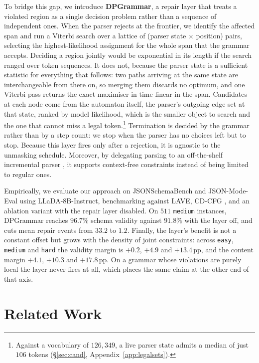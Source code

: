 \documentclass{article}
\begin{document}
To bridge this gap, we introduce \textbf{DPGrammar}, a repair layer that treats
a violated region as a single decision problem rather than a sequence of
independent ones. When the parser rejects at the frontier, we identify the
affected span and run a Viterbi search over a lattice of (parser state $\times$
position) pairs, selecting the highest-likelihood assignment for the whole span
that the grammar accepts. Deciding a region jointly would be exponential in its
length if the search ranged over token sequences. It does not, because the
parser state is a sufficient statistic for everything that follows: two paths
arriving at the same state are interchangeable from there on, so merging them
discards no optimum, and one Viterbi pass returns the exact maximiser in time
linear in the span. Candidates at each node come from the automaton
itself, the parser's outgoing edge set at that state, ranked by model
likelihood, which is the smaller object to search and the one that cannot miss a
legal token.\footnote{Against a vocabulary of $126{,}349$, a live parser state 
admits a median of just $106$ tokens (\S\ref{sec:cand}, Appendix~\ref{app:legalsets}).}
Termination is decided by the grammar rather than by a step count: we stop when
the parser has no choices left but to stop. Because this layer fires only after a 
rejection, it is agnostic to the unmasking schedule. Moreover, by delegating parsing 
to an off-the-shelf incremental parser \citep{microsoft2025llguidance}, it supports 
context-free constraints instead of being limited to regular ones.

Empirically, we evaluate our approach on JSONSchemaBench \citep{geng2025jsonschemabenchrigorousbenchmarkstructured} and JSON-Mode-Eval \citep{nousresearch2024jsonmodeeval,ethsri2025jsonmodeevalextended} using LLaDA-8B-Instruct, benchmarking against LAVE, CD-CFG \citep{cd4dllm}, and an ablation variant with the
repair layer disabled. On $511$
\texttt{medium} instances, DPGrammar reaches $96.7\%$ schema validity against
$91.8\%$ with the layer off, and cuts mean repair events from $33.2$ to $1.2$.
Finally, the layer's benefit is not a constant offset but grows with the
density of joint constraints: across \texttt{easy}, \texttt{medium} and
\texttt{hard} the validity margin is $+0.2$, $+4.9$ and $+13.4$\,pp, and the
content margin $+4.1$, $+10.3$ and $+17.8$\,pp. On a grammar whose violations
are purely local the layer never fires at all, which places the same claim at
the other end of that axis.

\section{Related Work}
\end{document}
